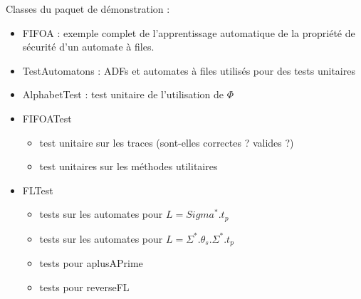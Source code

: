 Classes du paquet de démonstration :
\begin{itemize}
  \item FIFOA : exemple complet de l'apprentissage automatique de la propriété de sécurité d'un automate à files.
  \item TestAutomatons : ADFs et automates à files utilisés pour des tests unitaires
  \item AlphabetTest : test unitaire de l'utilisation de $\Phi$
  \item FIFOATest
    \begin{itemize}
      \item test unitaire sur les traces (sont-elles correctes ? valides ?)
      \item test unitaires sur les méthodes utilitaires
    \end{itemize}
  \item FLTest
    \begin{itemize}
      \item tests sur les automates pour $L=Sigma^*.t_p$
      \item tests sur les automates pour $L=\Sigma^*.\theta_s.\Sigma^*.t_p$
      \item tests pour aplusAPrime
      \item tests pour reverseFL
    \end{itemize}
\end{itemize}
